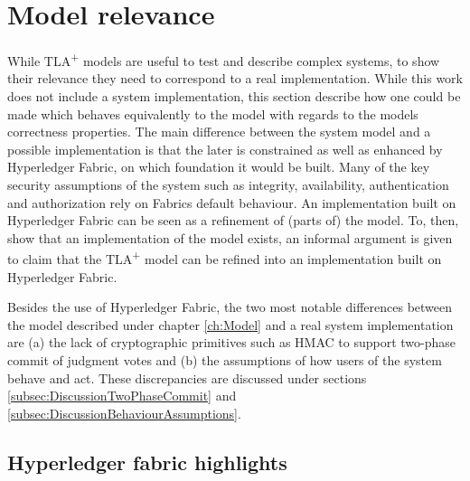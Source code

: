 \section{Model relevance}

While TLA\textsuperscript+ models are useful to test and describe complex systems, to show their relevance they need to correspond to a real implementation. While this work does not include a system implementation, this section describe how one could be made which behaves equivalently to the model with regards to the models correctness properties. The main difference between the system model and a possible implementation is that the later is constrained as well as enhanced by Hyperledger Fabric, on which foundation it would be built. Many of the key security assumptions of the system such as integrity, availability, authentication and authorization rely on Fabrics default behaviour. An implementation built on Hyperledger Fabric can be seen as a refinement of (parts of) the model. To, then, show that an implementation of the model exists, an informal argument is given to claim that the TLA\textsuperscript+ model can be refined into an implementation built on Hyperledger Fabric.

Besides the use of Hyperledger Fabric, the two most notable differences between the model described under chapter \ref{ch:Model} and a real system implementation are (a) the lack of cryptographic primitives such as HMAC to support two-phase commit of judgment votes and (b) the assumptions of how users of the system behave and act. These discrepancies are discussed under sections \ref{subsec:DiscussionTwoPhaseCommit} and \ref{subsec:DiscussionBehaviourAssumptions}.

\subsection{Hyperledger fabric highlights}
\label{subsec:hyperledger-highlights}

